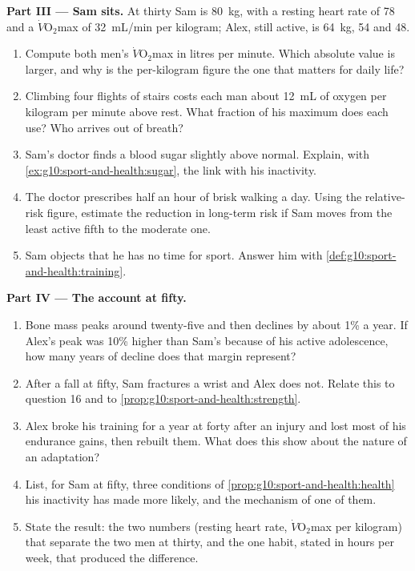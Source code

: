\begin{problem}
\medskip
\noindent\textbf{Part III --- Sam sits.}
At thirty Sam is \qty{80}{kg}, with a resting heart rate of 78 and a
$\dot V\!\mathrm{O_2}$max of \qty{32}{mL/min} per kilogram; Alex, still
active, is \qty{64}{kg}, 54 and \num{48}.
\begin{enumerate}[resume]
  \item Compute both men's $\dot V\!\mathrm{O_2}$max in litres per
        minute. Which absolute value is larger, and why is the
        per-kilogram figure the one that matters for daily life?
  \item Climbing four flights of stairs costs each man about
        \qty{12}{mL} of oxygen per kilogram per minute above rest.
        What fraction of his maximum does each use? Who arrives out of
        breath?
  \item Sam's doctor finds a blood sugar slightly above normal.
        Explain, with \cref{ex:g10:sport-and-health:sugar}, the link
        with his inactivity.
  \item The doctor prescribes half an hour of brisk walking a day.
        Using the relative-risk figure, estimate the reduction in
        long-term risk if Sam moves from the least active fifth to the
        moderate one.
  \item Sam objects that he has no time for sport. Answer him with
        \cref{def:g10:sport-and-health:training}.
\end{enumerate}

\medskip
\noindent\textbf{Part IV --- The account at fifty.}
\begin{enumerate}[resume]
  \item Bone mass peaks around twenty-five and then declines by about
        1\% a year. If Alex's peak was 10\% higher than Sam's because
        of his active adolescence, how many years of decline does that
        margin represent?
  \item After a fall at fifty, Sam fractures a wrist and Alex does
        not. Relate this to question 16 and to
        \cref{prop:g10:sport-and-health:strength}.
  \item Alex broke his training for a year at forty after an injury
        and lost most of his endurance gains, then rebuilt them. What
        does this show about the nature of an adaptation?
  \item List, for Sam at fifty, three conditions of
        \cref{prop:g10:sport-and-health:health} his inactivity has made
        more likely, and the mechanism of one of them.
  \item State the result: the two numbers (resting heart rate,
        $\dot V\!\mathrm{O_2}$max per kilogram) that separate the two
        men at thirty, and the one habit, stated in hours per week,
        that produced the difference.
\end{enumerate}
\end{problem}
